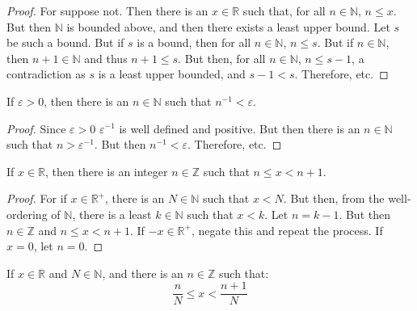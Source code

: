             \begin{proof}
                For suppose not. Then there is an $x\in\mathbb{R}$
                such that, for all $n\in\mathbb{N}$, $n\leq{x}$.
                But then $\mathbb{N}$ is bounded above, and then
                there exists a least upper bound. Let $s$ be such
                a bound. But if $s$ is a bound, then for all
                $n\in\mathbb{N}$, $n\leq{s}$. But if
                $n\in\mathbb{N}$, then $n+1\in\mathbb{N}$ and thus
                $n+1\leq{s}$. But then, for all $n\in\mathbb{N}$,
                $n\leq{s-1}$, a contradiction as $s$ is a least
                upper bounded, and $s-1<s$. Therefore, etc.
            \end{proof}
            \begin{theorem}
                If $\varepsilon>0$, then there is an
                $n\in\mathbb{N}$ such that
                $n^{\minus{1}}<\varepsilon$.
            \end{theorem}
            \begin{proof}
                Since $\varepsilon>0$ $\varepsilon^{\minus{1}}$ is
                well defined and positive. But then there is an
                $n\in\mathbb{N}$ such that
                $n>\varepsilon^{\minus{1}}$. But then
                $n^{\minus{1}}<\varepsilon$. Therefore, etc.
            \end{proof}
            \begin{theorem}
                If $x\in\mathbb{R}$, then there is an integer
                $n\in\mathbb{Z}$ such that
                $n\leq{x}<n+1$.
            \end{theorem}
            \begin{proof}
                For if $x\in\mathbb{R}^{+}$, there is an
                $N\in\mathbb{N}$ such that $x<N$. But then, from
                the well-ordering of $\mathbb{N}$, there is a
                least $k\in\mathbb{N}$ such that
                $x<k$. Let $n=k-1$. But then $n\in\mathbb{Z}$ and
                $n\leq{x}<n+1$. If $\minus{x}\in\mathbb{R}^{+}$,
                negate this and repeat the process. If $x=0$, let
                $n=0$.
            \end{proof}
            \begin{theorem}
                If $x\in\mathbb{R}$ and $N\in\mathbb{N}$, and there
                is an $n\in\mathbb{Z}$ such that:
                \begin{equation}
                    \frac{n}{N}\leq{x}<\frac{n+1}{N}
                \end{equation}
            \end{theorem}

